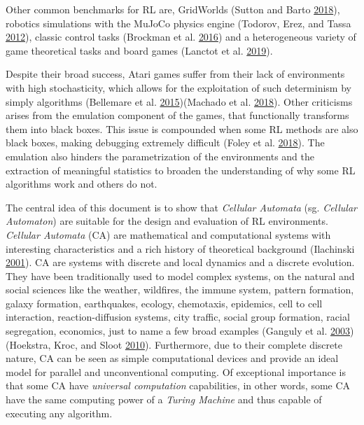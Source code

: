 \documentclass[
  12pt,
  openany]{book}
\begin{document}
Other common benchmarks for RL are, GridWorlds (Sutton and Barto \protect\hyperlink{ref-sutton2018reinforcement}{2018}), robotics simulations with the MuJoCo physics engine (Todorov, Erez, and Tassa \protect\hyperlink{ref-todorov2012mujoco}{2012}), classic control tasks (Brockman et al. \protect\hyperlink{ref-1606.01540}{2016}) and a heterogeneous variety of game theoretical tasks and board games (Lanctot et al. \protect\hyperlink{ref-lanctot2019openspiel}{2019}).

Despite their broad success, Atari games suffer from their lack of environments with high stochasticity, which allows for the exploitation of such determinism by simply algorithms (Bellemare et al. \protect\hyperlink{ref-bellemare2015arcade}{2015})(Machado et al. \protect\hyperlink{ref-machado2018revisiting}{2018}). Other criticisms arises from the emulation component of the games, that functionally transforms them into black boxes. This issue is compounded when some RL methods are also black boxes, making debugging extremely difficult (Foley et al. \protect\hyperlink{ref-foley2018toybox}{2018}). The emulation also hinders the parametrization of the environments and the extraction of meaningful statistics to broaden the understanding of why some RL algorithms work and others do not.

The central idea of this document is to show that \emph{Cellular Automata} (sg. \emph{Cellular Automaton}) are suitable for the design and evaluation of RL environments. \emph{Cellular Automata} (CA) are mathematical and computational systems with interesting characteristics
and a rich history of theoretical background (Ilachinski \protect\hyperlink{ref-ilachinski2001cellular}{2001}). CA are systems with discrete and local dynamics and a discrete evolution. They have been traditionally used to model complex systems, on the natural and social sciences like the weather, wildfires, the immune system, pattern formation, galaxy formation, earthquakes, ecology, chemotaxis, epidemics, cell to cell interaction, reaction-diffusion systems, city traffic, social group formation, racial segregation, economics, just to name a few broad examples (Ganguly et al. \protect\hyperlink{ref-ganguly2003survey}{2003})(Hoekstra, Kroc, and Sloot \protect\hyperlink{ref-hoekstra2010simulating}{2010}). Furthermore, due to their complete discrete nature, CA can be seen as simple computational devices and provide an ideal model for parallel and unconventional computing. Of exceptional importance is that some CA have \emph{universal computation} capabilities, in other words, some CA have the same computing power of a \emph{Turing Machine} and thus capable of executing any algorithm.
\end{document}

